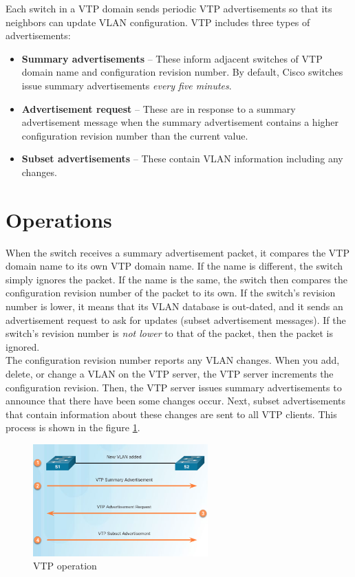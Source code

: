 Each switch in a VTP domain sends periodic VTP advertisements so that its neighbors can update VLAN configuration. VTP includes three types of advertisements:

\begin{itemize}
\item \textbf{Summary advertisements} -- These inform adjacent switches of VTP domain name and configuration revision number. By default, Cisco switches issue summary advertisements \emph{every five minutes}. 
\item \textbf{Advertisement request} -- These are in response to a summary advertisement message when the summary advertisement contains a higher configuration revision number than the current value.
\item \textbf{Subset advertisements} -- These contain VLAN information including any changes.
\end{itemize}

\section{Operations}

When the switch receives a summary advertisement packet, it compares the VTP domain name to its own VTP domain name. If the name is different, the switch simply ignores the packet. If the name is the same, the switch then compares the configuration revision number of the packet to its own. If the switch's revision number is lower, it means that its VLAN database is out-dated, and it sends an advertisement request to ask for updates (subset advertisement messages). If the switch's revision number is \emph{not lower} to that of the packet, then the packet is ignored. \\

The configuration revision number reports any VLAN changes. When you add, delete, or change a VLAN on the VTP server, the VTP server increments the configuration revision. Then, the VTP server issues summary advertisements to announce that there have been some changes occur. Next, subset advertisements that contain information about these changes are sent to all VTP clients. This process is shown in the figure \ref{VTP-operation}.\\

\begin{figure}[hbtp]
\centering
\includegraphics[width=0.6\textwidth]{pictures/VTP-operation.png}
\caption{VTP operation}
\label{VTP-operation}
\end{figure}

